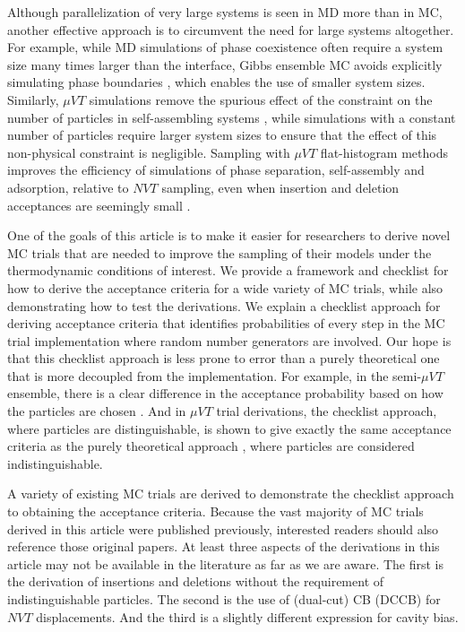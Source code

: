 \documentclass[
  9pt,
  bestpractices,
]{livecoms}
\begin{document}
Although parallelization of very large systems is seen in MD more than in MC, another effective approach is to circumvent the need for large systems altogether.
For example, while MD simulations of phase coexistence often require a system size many times larger than the interface, Gibbs ensemble MC avoids explicitly simulating phase boundaries \cite{panagiotopoulos_direct_1987}, which enables the use of smaller system sizes.
Similarly, $\mu VT$ simulations remove the spurious effect of the constraint on the number of particles in self-assembling systems \cite{floriano_micellization_1999, hatch_computational_2015}, while simulations with a constant number of particles require larger system sizes to ensure that the effect of this non-physical constraint is negligible.
Sampling with $\mu VT$ flat-histogram methods improves the efficiency of simulations of phase separation, self-assembly and adsorption, relative to $NVT$ sampling, even when insertion and deletion acceptances are seemingly small \cite{hatch_efficiency_2023}.

One of the goals of this article is to make it easier for researchers to derive novel MC trials that are needed to improve the sampling of their models under the thermodynamic conditions of interest.
We provide a framework and checklist for how to derive the acceptance criteria for a wide variety of MC trials, while also demonstrating how to test the derivations.
We explain a checklist approach for deriving acceptance criteria that identifies probabilities of every step in the MC trial implementation where random number generators are involved.
Our hope is that this checklist approach is less prone to error than a purely theoretical one that is more decoupled from the implementation.
For example, in the semi-$\mu VT$ ensemble, there is a clear difference in the acceptance probability based on how the particles are chosen \cite{kofke_monte_1988}.
And in $\mu VT$ trial derivations, the checklist approach, where particles are distinguishable, is shown to give exactly the same acceptance criteria as the purely theoretical approach \cite{frenkel_understanding_2002}, where particles are considered indistinguishable.

A variety of existing MC trials are derived to demonstrate the checklist approach to obtaining the acceptance criteria.
Because the vast majority of MC trials derived in this article were published previously, interested readers should also reference those original papers.
At least three aspects of the derivations in this article may not be available in the literature as far as we are aware.
The first is the derivation of insertions and deletions without the requirement of indistinguishable particles.
The second is the use of (dual-cut) CB (DCCB) \cite{vlugt_improving_1998} for $NVT$ displacements.
And the third is a slightly different expression for cavity bias.
\end{document}
